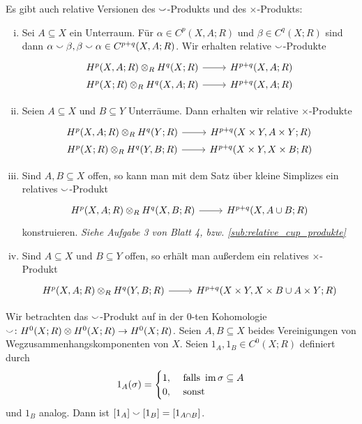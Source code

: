 \begin{bemerkung}[{name=[relative Versionen des Cup- und Kreuz-Produktes]},label=bem:rel_cup]
	Es gibt auch relative Versionen des $\cupp$-Produkts und des $\times$-Produkts:
	\begin{enumerate}[(i)]
		\item Sei $A \subseteq X$ ein Unterraum. 
		Für $\alpha \in C^p(X,A;R)$ und $\beta \in C^q(X;R)$ sind dann $\alpha \cupp \beta, \beta \cupp \alpha \in C^{p+q}(X,A;R)$. 
		Wir erhalten relative $\cupp$-Produkte
		\[
			\begin{tikzcd}[row sep=0em]
				H^p(X,A;R) \otimes_R H^q(X;R) \rar & \minwidthbox{H^{p+q}(X,A;R)}{2cm} \\
				H^p(X;R) \otimes_R H^q(X,A;R) \rar & \minwidthbox{H^{p+q}(X,A;R)}{2cm} 
			\end{tikzcd}
		\]
		\item Seien $A \subseteq X$ und $B \subseteq Y$ Unterräume.
		Dann erhalten wir relative $\times$-Produkte
		\[
			\begin{tikzcd}[row sep=0em]
				H^p(X,A;R) \otimes_R H^q(Y;R) \rar & H^{p+q}(X \times Y, A \times Y;R) \\
				H^p(X;R) \otimes_R H^q(Y,B;R) \rar & H^{p+q}(X \times Y,X \times B;R) 
			\end{tikzcd}
		\]
		\item Sind $A,B \subseteq X$ offen, so kann man mit dem Satz über kleine Simplizes ein relatives $\cupp$-Produkt
		\[
			\begin{tikzcd}
				H^p(X,A;R) \otimes_R H^q(X,B;R) \rar & H^{p+q}(X,A \cup B;R)
			\end{tikzcd}
		\]
		konstruieren. \emph{Siehe Aufgabe 3 von Blatt 4, bzw. \cref{sub:relative_cup_produkte}}
		\item Sind $A \subseteq X$ und $B \subseteq Y$ offen, so erhält man außerdem ein relatives $\times$-Produkt
		\[
			\begin{tikzcd}
				H^p(X,A;R) \otimes_R H^q(Y,B;R) \rar & H^{p+q}(X \times Y,X \times B \cup A \times Y;R)
			\end{tikzcd}
		\]
	\end{enumerate}
\end{bemerkung}

\begin{beispiel}[{name=[Cup-Produkt in der $0$-ten Kohomologie]}]
	Wir betrachten das $\cupp$-Produkt auf in der $0$-ten Kohomologie $\cupp \colon H^0(X;R) \otimes H^0(X;R) \to H^0(X;R)$. 
	Seien $A,B \subseteq X$ beides Vereinigungen von Wegzusammenhangskomponenten von $X$. 
	Seien $1_A, 1_B \in C^0(X;R)$ definiert durch 
	\[
		1_A(\sigma) = \begin{cases}
			1, &\text{ falls } \im \sigma \subseteq A\\
			0 , & \text{ sonst} 
		\end{cases}
	\]
	und $1_B$ analog. Dann ist $\benbrace*{1_A} \cupp \benbrace*{1_B} = \benbrace*{1_{A \cap B}}$.
\end{beispiel}

